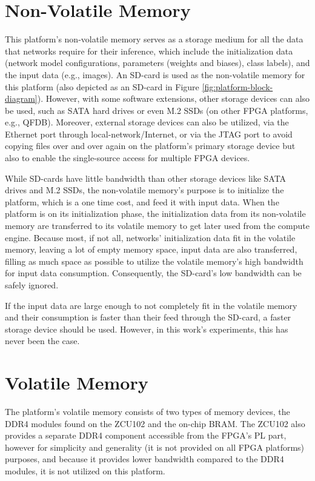 \section{Non-Volatile Memory}
This platform's non-volatile memory serves as a storage medium for all the data that networks require for their inference, which include the initialization data (network model configurations, parameters (weights and biases), class labels), and the input data (e.g., images). An SD-card is used as the non-volatile memory for this platform (also depicted as an SD-card in Figure \ref{fig:platform-block-diagram}). However, with some software extensions, other storage devices can also be used, such as SATA hard drives or even M.2 SSDs (on other FPGA platforms, e.g., QFDB). Moreover, external storage devices can also be utilized, via the Ethernet port through local-network/Internet, or via the JTAG port to avoid copying files over and over again on the platform's primary storage device but also to enable the single-source access for multiple FPGA devices.

While SD-cards have little bandwidth than other storage devices like SATA drives and M.2 SSDs, the non-volatile memory's purpose is to initialize the platform, which is a one time cost, and feed it with input data. When the platform is on its initialization phase, the initialization data from its non-volatile memory are transferred to its volatile memory to get later used from the compute engine. Because most, if not all, networks' initialization data fit in the volatile memory, leaving a lot of empty memory space, input data are also transferred, filling as much space as possible to utilize the volatile memory's high bandwidth for input data consumption. Consequently, the SD-card's low bandwidth can be safely ignored.

If the input data are large enough to not completely fit in the volatile memory and their consumption is faster than their feed through the SD-card, a faster storage device should be used. However, in this work's experiments, this has never been the case.

\section{Volatile Memory}
The platform's volatile memory consists of two types of memory devices, the DDR4 modules found on the ZCU102 and the on-chip BRAM. The ZCU102 also provides a separate DDR4 component accessible from the FPGA's PL part, however for simplicity and generality (it is not provided on all FPGA platforms) purposes, and because it provides lower bandwidth compared to the DDR4 modules, it is not utilized on this platform.

